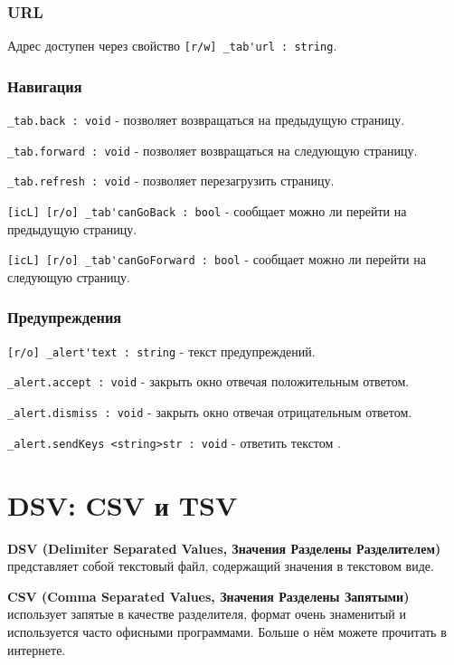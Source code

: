 \documentclass[a4paper, 14pt]{extarticle}
\newcommand{\ferror}[1]{{\fontsize{11pt}{12pt}\tt{\sethlcolor{yellow}\hl{#1}}}}
\begin{document}
\subsubsection{URL}

Адрес доступен через свойство \lstinline|[r/w] _tab'url : string|.

\subsubsection{Навигация}

\lstinline|_tab.back : void| - позволяет возвращаться на предыдущую страницу.

\lstinline|_tab.forward : void| - позволяет возвращаться на следующую страницу.

\lstinline|_tab.refresh : void| -  позволяет перезагрузить страницу.

\lstinline|[icL] [r/o] _tab'canGoBack : bool| - сообщает можно ли перейти на предыдущую страницу.

\lstinline|[icL] [r/o] _tab'canGoForward : bool| - сообщает можно ли перейти на следующую страницу.


\subsubsection{Предупреждения}

\lstinline|[r/o] _alert'text : string| - текст предупреждений.

\lstinline|_alert.accept : void| - закрыть окно отвечая положительным ответом.

\lstinline|_alert.dismiss : void| - закрыть окно отвечая отрицательным ответом.

\lstinline|_alert.sendKeys <string>str : void| - ответить текстом .


\section{DSV: CSV и TSV}

{\bf DSV (Delimiter Separated Values, Значения Разделены Разделителем)} представляет собой текстовый файл, содержащий значения в текстовом виде.

{\bf CSV (Comma Separated Values, Значения Разделены Запятыми)} использует запятые в качестве разделителя, формат очень знаменитый и используется часто офисными программами. Больше о нём можете прочитать в интернете.
\end{document}
